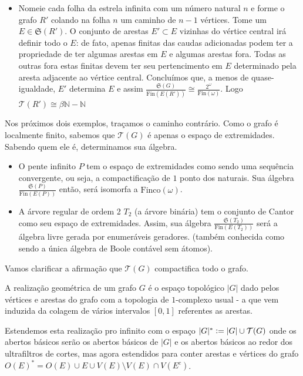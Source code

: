 \documentclass[11pt]{article}
\newcommand{\defeq}{\vcentcolon=}
\newcommand{\pulinho}{\vspace{.5cm}}
\theoremstyle{definition}
\theoremstyle{definition}
\theoremstyle{definition}
\theoremstyle{definition}
\theoremstyle{definition}
\theoremstyle{definition}
\theoremstyle{definition}
\theoremstyle{definition}
\newtheorem*{definition*}{Definição}
\newenvironment{definicao*}{
\definecolor{shadecolor}{HTML}{defcfc}
\begin{shaded}
\begin{definition*}
}
{
\end{definition*}
\end{shaded}
}
\theoremstyle{definition}
\theoremstyle{definition}
\newtheorem*{example*}{Exemplo}
\newenvironment{exemplo*}{
\definecolor{shadecolor}{HTML}{b9e6d3}
\begin{shaded}
\begin{example*}
}
{
\end{example*}
\end{shaded}
}
\theoremstyle{definition}
\theoremstyle{definition}
\begin{document}
\begin{exemplo*}
    \begin{itemize}[]
        \item Nomeie cada folha da estrela infinita com um número natural $n$ e forme o grafo $R'$ colando na folha $n$ um caminho de $n-1$ vértices. Tome um $E \in \mathfrak{S}(R')$. O conjunto de arestas $E' \subset E$ vizinhas do vértice central irá definir todo o $E$: de fato, apenas finitas das caudas adicionadas podem ter a propriedade de ter algumas arestas em $E$ e algumas arestas fora. Todas as outras fora estas finitas devem ter seu pertencimento em $E$ determinado pela aresta adjacente ao vértice central. Concluímos que, a menos de quase-igualdade, $E'$ determina $E$ e assim $\frac{\mathfrak{S}(G)}{\text{Fin}(E(R'))} \cong \frac{2^\omega}{\text{Fin}(\omega)}$. Logo $\mathcal{T}(R') \cong \beta\mathbb{N} - \mathbb{N}$
    \end{itemize}

    \pulinho
    
    Nos próximos dois exemplos, traçamos o caminho contrário. Como o grafo é localmente finito, sabemos que $\mathcal{T}(G)$ é apenas o espaço de extremidades. Sabendo quem ele é, determinamos sua álgebra.

        \begin{itemize}[]
        \item O pente infinito $P$ tem o espaço de extremidades como sendo uma sequência convergente, ou seja, a compactificação de $1$ ponto dos naturais. Sua álgebra $\frac{\mathfrak{S}(P)}{\text{Fin}(E(P))}$ então, será isomorfa a $\text{Finco}(\omega)$.

        \item A árvore regular de ordem 2 $T_2$ (a árvore binária) tem o conjunto de Cantor como seu espaço de extremidades. Assim, sua álgebra $\frac{\mathfrak{S}(T_2)}{\text{Fin}(E(T_2))}$ será a álgebra livre gerada por enumeráveis geradores. (também conhecida como sendo a única álgebra de Boole contável sem átomos).
        \end{itemize}
\end{exemplo*}

Vamos clarificar a afirmação que $\mathcal{T}(G)$ compactifica todo o grafo.

\begin{definicao*}
    A realização geométrica de um grafo $G$ é o espaço topológico  $|G|$ dado pelos vértices e arestas do grafo com a topologia de $1$-complexo usual - a que vem induzida da colagem de vários intervalos $[0,1]$ referentes as arestas. 
    
    \pulinho
    Estendemos esta realização pro infinito com o espaço $|G|^* \defeq |G| \cup \mathcal{T}(G)$ onde os abertos básicos serão os abertos básicos de $|G|$ e os abertos básicos ao redor dos ultrafiltros de cortes, mas agora estendidos para conter arestas e vértices do grafo $O(E)^* = O(E) \cup  E \cup V(E) \setminus V(E)\cap V(E^c)$. 
\end{definicao*} 
\end{document}
